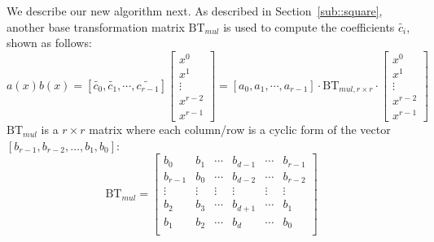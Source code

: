 \documentclass[runningheads]{llncs}
\begin{document}
We describe our new algorithm next. As described in Section~\ref{sub::square},
another base transformation matrix $\text{BT}_{mul}$ is used to compute the coefficients $\widetilde{c_{i}}$, shown as follows:
\[
a(x)b(x)= [\widetilde{c_{0}},\widetilde{c_{1}},\cdots,\widetilde{c_{r-1}}]\left[ \begin{array}{c}
x^{0} \\
x^{1} \\
\vdots\\
x^{r-2}\\
x^{r-1}
\end{array}
\right ]
=
[{a_{0}},{a_{1}},\cdots,{a_{r-1}}]
\cdot \text{BT}_{mul,r\times r} \cdot
\left[ \begin{array}{c}
x^{0} \\
x^{1} \\
\vdots\\
x^{r-2}\\
x^{r-1}
\end{array}
\right ]
\]
$\text{BT}_{mul}$ is a $r\times r$ matrix where each column/row is a cyclic form of the vector $[b_{r-1},b_{r-2},\ldots, b_{1},b_{0}]$:
\[
\text{BT}_{mul} =
\left[ \begin{array}{cccccc}
b_{0}&b_{1}&\cdots&b_{d-1}&\cdots &b_{r-1} \\
b_{r-1}&b_{0}&\cdots&b_{d-2}&\cdots &b_{r-2} \\
\vdots&\vdots&\vdots&\vdots&\vdots&\vdots\\
b_{2}&b_{3}&\cdots&b_{d+1}&\cdots &b_{1} \\
b_{1}&b_{2}&\cdots&b_{d}&\cdots &b_{0} \\
\end{array}
\right ]
\]
\end{document}

